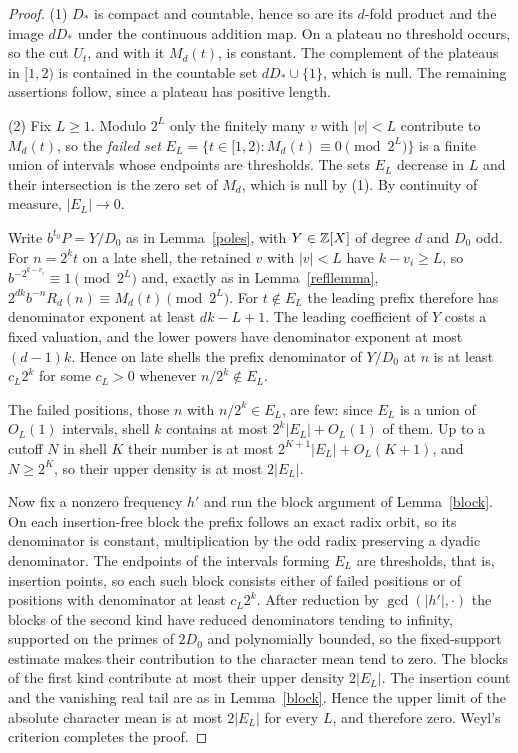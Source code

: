 \documentclass[11pt]{article}
\begin{document}
\begin{proof}
(1) \(D_*\) is compact and countable, hence so are its \(d\)-fold product
and the image \(dD_*\) under the continuous addition map. On a plateau no
threshold occurs, so the cut \(U_t\), and with it \(M_d(t)\), is constant.
The complement of the plateaus in \([1,2)\) is contained in the countable
set \(dD_*\cup\{1\}\), which is null. The remaining assertions follow,
since a plateau has positive length.

(2) Fix \(L\ge1\). Modulo \(2^L\) only the finitely many \(v\) with
\(|v|<L\) contribute to \(M_d(t)\), so the \emph{failed set}
\(E_L=\{t\in[1,2):M_d(t)\equiv0\pmod{2^L}\}\) is a finite union of
intervals whose endpoints are thresholds. The sets \(E_L\) decrease in
\(L\) and their intersection is the zero set of \(M_d\), which is null by
(1). By continuity of measure, \(|E_L|\to0\).

Write \(b^{t_0}P=Y/D_0\) as in Lemma~\ref{poles}, with \(Y\in\mathbb Z[X]\) of
degree \(d\) and \(D_0\) odd. For \(n=2^kt\) on a late shell, the retained
\(v\) with \(|v|<L\) have \(k-v_i\ge L\), so
\(b^{-2^{k-v_i}}\equiv1\pmod{2^L}\) and, exactly as in
Lemma~\ref{refllemma}, \(2^{dk}b^{-n}R_d(n)\equiv M_d(t)\pmod{2^L}\). For
\(t\notin E_L\) the leading prefix therefore has denominator exponent at
least \(dk-L+1\). The leading coefficient of \(Y\) costs a fixed
valuation, and the lower powers have denominator exponent at most
\((d-1)k\). Hence on late shells the prefix denominator of \(Y/D_0\) at
\(n\) is at least \(c_L2^{k}\) for some \(c_L>0\) whenever
\(n/2^k\notin E_L\).

The failed positions, those \(n\) with \(n/2^k\in E_L\), are few: since
\(E_L\) is a union of \(O_L(1)\) intervals, shell \(k\) contains at most
\(2^k|E_L|+O_L(1)\) of them. Up to a cutoff \(N\) in shell \(K\) their
number is at most \(2^{K+1}|E_L|+O_L(K+1)\), and \(N\ge2^K\), so their
upper density is at most \(2|E_L|\).

Now fix a nonzero frequency \(h'\) and run the block argument of
Lemma~\ref{block}. On each insertion-free block the prefix follows an
exact radix orbit, so its denominator is constant, multiplication by the
odd radix preserving a dyadic denominator. The endpoints of the intervals
forming \(E_L\) are thresholds, that is, insertion points, so each such
block consists either of failed positions or of positions with
denominator at least \(c_L2^k\). After reduction by \(\gcd(|h'|,\cdot)\)
the blocks of the second kind have reduced denominators tending to
infinity, supported on the primes of \(2D_0\) and polynomially bounded,
so the fixed-support estimate makes their contribution to the character
mean tend to zero. The blocks of the first kind contribute at most their
upper density \(2|E_L|\). The insertion count and the vanishing real tail
are as in Lemma~\ref{block}. Hence the upper limit of the absolute
character mean is at most \(2|E_L|\) for every \(L\), and therefore zero.
Weyl's criterion completes the proof.
\end{proof}
\end{document}
